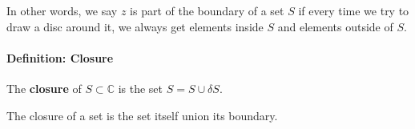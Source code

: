 \documentclass[]{article}
\begin{document}
\bigskip

In other words, we say $z$ is part of the boundary of a set $S$ if every time we try to draw a disc around it, we always get elements inside $S$ and elements outside of $S$.

\paragraph{Definition: Closure} The \textbf{closure} of $S \subset \mathbb{C}$ is the set $S = S \cup \delta S$.

\bigskip

The closure of a set is the set itself union its boundary.
\end{document}
